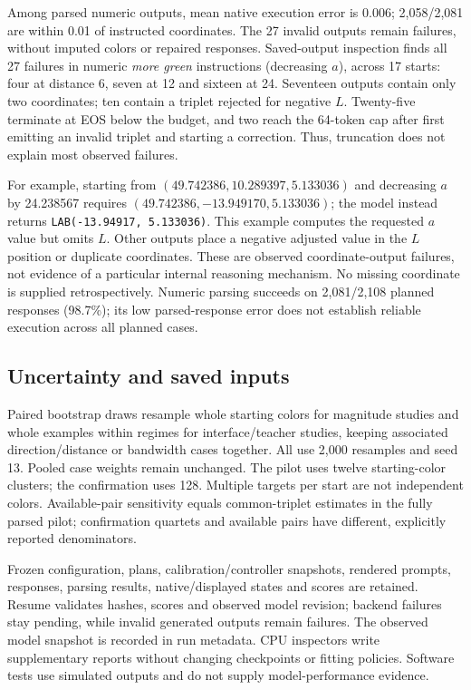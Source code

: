 Among parsed numeric outputs, mean native execution error is 0.006;
2{,}058/2{,}081 are within 0.01 of instructed coordinates.
The 27 invalid outputs remain failures, without imputed colors or repaired
responses. Saved-output inspection finds all 27 failures in numeric
\textit{more green} instructions (decreasing $a$), across 17 starts:
four at distance 6, seven at 12 and sixteen at 24. Seventeen outputs
contain only two coordinates; ten contain a triplet rejected for negative
$L$. Twenty-five terminate at EOS below the budget, and two reach the
64-token cap after first emitting an invalid triplet and starting a correction.
Thus, truncation does not explain most observed failures.

For example, starting from $(49.742386,10.289397,5.133036)$ and decreasing
$a$ by 24.238567 requires $(49.742386,-13.949170,5.133036)$;
the model instead returns \texttt{LAB(-13.94917, 5.133036)}.
This example computes the requested $a$ value but omits $L$.
Other outputs place a negative adjusted value in the $L$ position or
duplicate coordinates. These are observed coordinate-output failures,
not evidence of a particular internal reasoning mechanism. No missing
coordinate is supplied retrospectively. Numeric parsing succeeds on
2{,}081/2{,}108 planned responses (98.7\%); its low parsed-response error
does not establish reliable execution across all planned cases.

\subsection{Uncertainty and saved inputs}
Paired bootstrap draws resample whole starting colors for magnitude studies
and whole examples within regimes for interface/teacher studies, keeping
associated direction/distance or bandwidth cases together. All use 2{,}000
resamples and seed 13. Pooled case weights remain unchanged. The pilot
uses twelve starting-color clusters; the confirmation uses 128. Multiple
targets per start are not independent colors. Available-pair sensitivity
equals common-triplet estimates in the fully parsed pilot; confirmation
quartets and available pairs have different, explicitly reported denominators.

Frozen configuration, plans, calibration/controller snapshots, rendered
prompts, responses, parsing results, native/displayed states and scores are
retained. Resume validates hashes, scores and observed model revision; backend
failures stay pending, while invalid generated outputs remain failures.
The observed model snapshot is recorded in run metadata. CPU inspectors
write supplementary reports without changing checkpoints or fitting policies.
Software tests use simulated outputs and do not supply model-performance evidence.

